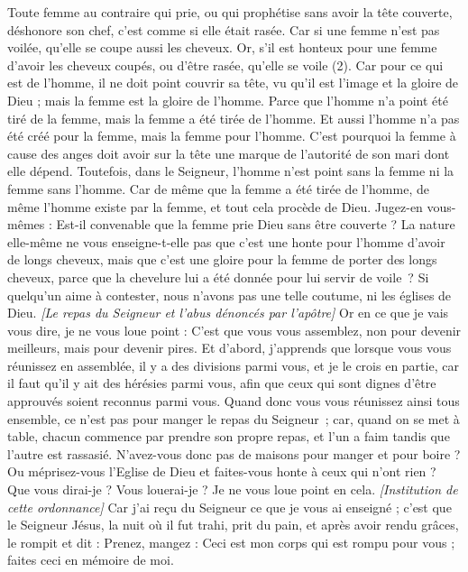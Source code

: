 \begin{multicols}{2}
Toute femme au contraire qui prie, ou qui prophétise sans avoir la tête couverte, déshonore son chef, c'est comme si elle était rasée.
Car si une femme n'est pas voilée, qu’elle se coupe aussi les cheveux. Or, s'il est honteux pour une femme d'avoir les cheveux coupés, ou d'être rasée, qu'elle se voile (2).
Car pour ce qui est de l'homme, il ne doit point couvrir sa tête, vu qu'il est l'image et la gloire de Dieu ; mais la femme est la gloire de l'homme.
Parce que l'homme n'a point été tiré de la femme, mais la femme a été tirée de l'homme.
Et aussi l'homme n'a pas été créé pour la femme, mais la femme pour l'homme.
C'est pourquoi la femme à cause des anges doit avoir sur la tête une marque de l’autorité de son mari dont elle dépend.
Toutefois, dans le Seigneur, l'homme n'est point sans la femme ni la femme sans l'homme.
Car de même que la femme a été tirée de l'homme, de même l'homme existe par la femme, et tout cela procède de Dieu.
Jugez-en vous-mêmes : Est-il convenable que la femme prie Dieu sans être couverte ?
La nature elle-même ne vous enseigne-t-elle pas que c’est une honte pour l'homme d’avoir de longs cheveux,
mais que c’est une gloire pour la femme de porter des longs cheveux, parce que la chevelure lui a été donnée pour lui servir de voile ?
Si quelqu'un aime à contester, nous n'avons pas une telle coutume, ni les églises de Dieu.
\textit{[Le repas du Seigneur et l'abus dénoncés par l'apôtre]}
Or en ce que je vais vous dire, je ne vous loue point : C’est que vous vous assemblez, non pour devenir meilleurs, mais pour devenir pires.
Et d’abord, j'apprends que lorsque vous vous réunissez en assemblée, il y a des divisions parmi vous, et je le crois en partie,
car il faut qu'il y ait des hérésies parmi vous, afin que ceux qui sont dignes d’être approuvés soient reconnus parmi vous.
Quand donc vous vous réunissez ainsi tous ensemble, ce n'est pas pour manger le repas du Seigneur ;
car, quand on se met à table, chacun commence par prendre son propre repas, et l'un a faim tandis que l'autre est rassasié.
N'avez-vous donc pas de maisons pour manger et pour boire ? Ou méprisez-vous l'Eglise de Dieu et faites-vous honte à ceux qui n'ont rien ? Que vous dirai-je ? Vous louerai-je ? Je ne vous loue point en cela.
\textit{[Institution de cette ordonnance]}
Car j'ai reçu du Seigneur ce que je vous ai enseigné ; c’est que le Seigneur Jésus, la nuit où il fut trahi, prit du pain,
et après avoir rendu grâces, le rompit et dit : Prenez, mangez : Ceci est mon corps qui est rompu pour vous ; faites ceci en mémoire de moi.

\end{multicols}
